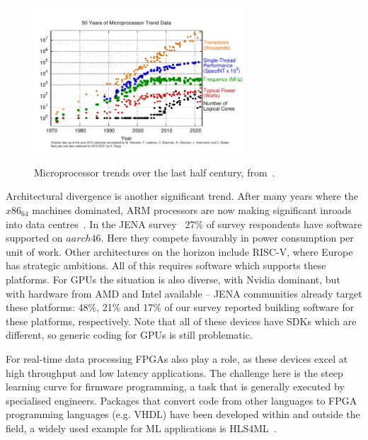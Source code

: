 \begin{figure}[htbp]
\begin{center}
\includegraphics[width=0.7\textwidth]{figures/50-years-processor-trend.pdf} \\ 
\caption{Microprocessor trends over the last half century, from~\cite{KRupp_Microprocessor_Data}.}
\label{figures:Fig5}
\end{center}
\end{figure}


Architectural divergence is another significant trend. After many years where the $x86_64$ machines dominated, ARM processors are now making significant inroads into data centres~\cite{ARM_Datacentre}. In the JENA survey~\cite{JENA-Spectrum-Survey-Report} 27\% of survey respondents have software supported on $aarch46$. Here they compete favourably in power consumption per unit of work. Other architectures on the horizon include RISC-V, where Europe has strategic ambitions. All of this requires software which supports these platforms. For GPUs the situation is also diverse, with Nvidia dominant\cite{Datacentre_report}, but with hardware from AMD and Intel available -- JENA communities already target these platforms: 48\%, 21\% and 17\% of our survey reported building software for these platforms, respectively. Note that all of these devices have SDKs which are different, so generic coding for GPUs is still problematic. 

For real-time data processing FPGAs also play a role, as these devices excel at high throughput and low latency applications. The challenge here is the steep learning curve for firmware programming, a task that is generally executed by specialised engineers. Packages that convert code from other languages to FPGA programming languages (e.g. VHDL) have been developed within and outside the field, a widely used example for ML applications is HLS4ML~\cite{Duarte:2018ite}.

